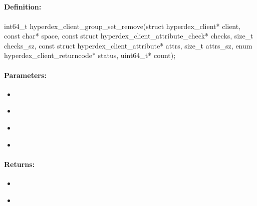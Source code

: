 \pagebreak
\subsection{}
\label{api:c:group_set_remove}


\paragraph{Definition:}
\begin{ccode}
int64_t hyperdex_client_group_set_remove(struct hyperdex_client* client,
        const char* space,
        const struct hyperdex_client_attribute_check* checks, size_t checks_sz,
        const struct hyperdex_client_attribute* attrs, size_t attrs_sz,
        enum hyperdex_client_returncode* status,
        uint64_t* count);
\end{ccode}

\paragraph{Parameters:}
\begin{itemize}[noitemsep]
\item {}\\

\item {}\\

\item {}\\

\item {}\\

\end{itemize}

\paragraph{Returns:}
\begin{itemize}[noitemsep]
\item {}\\

\item {}\\

\end{itemize}

